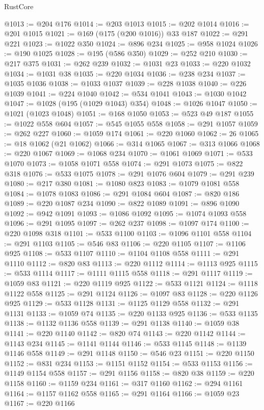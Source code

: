 \begin{lexlean}{RustCore}
\begin{coremodule}
@1013 := @204 @176
@1014 := @203 @1013
@1015 := @202 @1014
@1016 := @201 @1015
@1021 := @169 (@175 (@200 @1016)) @33 @187
@1022 := @291 @221
@1023 := @1022 @350
@1024 := @896 @234
@1025 := @958 @1024
@1026 := @190 @1025
@1028 := @195 (@586 @350)
@1029 := @252 @210
@1030 := @217 @375
@1031 := @262 @239
@1032 := @1031 @23
@1033 := @220 @1032
@1034 := @1031 @38
@1035 := @220 @1034
@1036 := @238 @234
@1037 := @1035 @1036
@1038 := @1033 @1037
@1039 := @228 @1038
@1040 := @226 @1039
@1041 := @224 @1040
@1042 := @534 @1041
@1043 := @1030 @1042
@1047 := @1028 (@195 (@1029 @1043) @354)
@1048 := @1026 @1047
@1050 := @1021 (@1023 @1048)
@1051 := @168 @1050
@1053 := @523 @49 @187
@1055 := @1022 @558 @604
@1057 := @545 @1055 @558
@1058 := @291 @1057
@1059 := @262 @227
@1060 := @1059 @174
@1061 := @220 @1060
@1062 := 26
@1065 := @18 @1062 (@21 @1062)
@1066 := @314 @1065
@1067 := @313 @1066
@1068 := @220 @1067
@1069 := @1068 @234
@1070 := @1061 @1069
@1071 := @533 @1070
@1073 := @1058 @1071 @558
@1074 := @291 @1073
@1075 := @822 @318
@1076 := @533 @1075
@1078 := @291 @1076 @604
@1079 := @291 @239
@1080 := @217 @380
@1081 := @1080 @823
@1083 := @1079 @1081 @558
@1084 := @1078 @1083
@1086 := @291 @1084 @604
@1087 := @820 @186
@1089 := @220 @1087 @234
@1090 := @822 @1089
@1091 := @896 @1090
@1092 := @942 @1091
@1093 := @1086 @1092
@1095 := @1074 @1093 @558
@1096 := @291 @1095
@1097 := @262 @237
@1098 := @1097 @174
@1100 := @220 @1098 @318
@1101 := @533 @1100
@1103 := @1096 @1101 @558
@1104 := @291 @1103
@1105 := @546 @83
@1106 := @220 @1105
@1107 := @1106 @925
@1108 := @533 @1107
@1110 := @1104 @1108 @558
@1111 := @291 @1110
@1112 := @820 @83
@1113 := @220 @1112
@1114 := @1113 @925
@1115 := @533 @1114
@1117 := @1111 @1115 @558
@1118 := @291 @1117
@1119 := @1059 @83
@1121 := @220 @1119 @925
@1122 := @533 @1121
@1124 := @1118 @1122 @558
@1125 := @291 @1124
@1126 := @1097 @83
@1128 := @220 @1126 @925
@1129 := @533 @1128
@1131 := @1125 @1129 @558
@1132 := @291 @1131
@1133 := @1059 @74
@1135 := @220 @1133 @925
@1136 := @533 @1135
@1138 := @1132 @1136 @558
@1139 := @291 @1138
@1140 := @1059 @38
@1141 := @220 @1140
@1142 := @820 @74
@1143 := @220 @1142
@1144 := @1143 @234
@1145 := @1141 @1144
@1146 := @533 @1145
@1148 := @1139 @1146 @558
@1149 := @291 @1148
@1150 := @546 @23
@1151 := @220 @1150
@1152 := @831 @234
@1153 := @1151 @1152
@1154 := @533 @1153
@1156 := @1149 @1154 @558
@1157 := @291 @1156
@1158 := @820 @38
@1159 := @220 @1158
@1160 := @1159 @234
@1161 := @317 @1160
@1162 := @294 @1161
@1164 := @1157 @1162 @558
@1165 := @291 @1164
@1166 := @1059 @23
@1167 := @220 @1166

\end{coremodule}
\end{lexlean}
